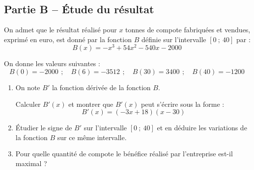 \documentclass[10pt]{article}
\providecommand{\np}[2][]{{#2~#1}}
\begin{document}
\subsection*{Partie B -- Étude du résultat}

On admet que le résultat réalisé pour $x$ tonnes de compote fabriquées et vendues, exprimé en euro, est donné par la fonction $B$ définie sur l'intervalle $[0~;~40]$ par :
\[ B(x) = -x^3+54x^2-540x-\np{2000} \]

On donne les valeurs suivantes :
\[B(0) = -\np{2000} \,;\quad B(6) = -\np{3512} \,;\quad B(30) = \np{3400} \,;\quad B(40) = -\np{1200}\]

\begin{enumerate}
	\item On note $B'$ la fonction dérivée de la fonction $B$.

	Calculer $B'(x)$ et montrer que $B'(x)$ peut s'écrire sous la forme :
	\[ B'(x) = (-3x + 18)(x - 30) \]
	\item Étudier le signe de $B'$ sur l'intervalle $[0~;~40]$ et en déduire les variations de la fonction $B$ sur ce même intervalle.
	\item Pour quelle quantité de compote le bénéfice réalisé par l'entreprise est-il maximal ?
\end{enumerate}

\medskip
\end{document}
